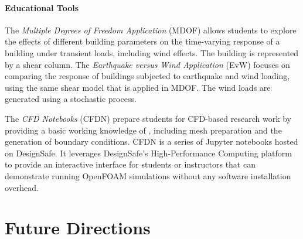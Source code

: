 \paragraph{Educational Tools} The \emph{Multiple Degrees of Freedom Application} (MDOF) allows students to explore the effects of different building parameters on the time-varying response of a building under transient loads, including wind effects. The building is represented by a shear column. The \emph{Earthquake versus Wind Application} (EvW) focuses on comparing the response of buildings subjected to earthquake and wind loading, using the same shear model that is applied in MDOF. The wind loads are generated using a stochastic process.

The \emph{CFD Notebooks} (CFDN) prepare students for CFD-based research work by providing a basic working knowledge of , including mesh preparation and the generation of boundary conditions. CFDN is a series of Jupyter notebooks hosted on DesignSafe. It leverages DesignSafe's High-Performance Computing platform to provide an interactive interface for students or instructors that can demonstrate running OpenFOAM simulations without any software installation overhead.


\section{Future Directions}
\label{sec:resp_cfd_wind_flow_future}

